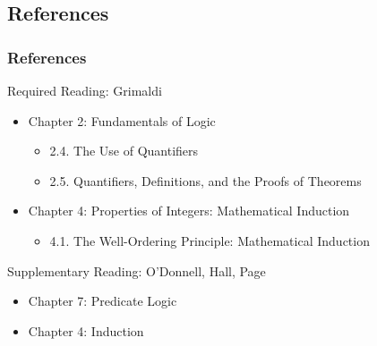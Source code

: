 \documentclass[dvipsnames]{beamer}
\begin{document}
%
%

\subsection*{References}

\begin{frame}
  \frametitle{References}

  \begin{block}{Required Reading: Grimaldi}
    \begin{itemize}
      \item Chapter 2: Fundamentals of Logic
      \begin{itemize}
        \item 2.4. \alert{The Use of Quantifiers}
        \item 2.5. \alert{Quantifiers, Definitions, and the Proofs of Theorems}
      \end{itemize}
      \item Chapter 4: Properties of Integers: Mathematical Induction
      \begin{itemize}
        \item 4.1. \alert{The Well-Ordering Principle: Mathematical Induction}
      \end{itemize}
    \end{itemize}
  \end{block}

  \begin{block}{Supplementary Reading: O'Donnell, Hall, Page}
    \begin{itemize}
      \item Chapter 7: Predicate Logic
      \item Chapter 4: Induction
    \end{itemize}
  \end{block}
\end{frame}
\end{document}
